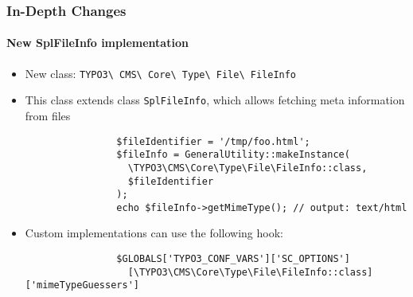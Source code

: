 \begin{frame}[fragile]
	\frametitle{In-Depth Changes}
	\framesubtitle{New SplFileInfo implementation}

	\lstset{basicstyle=\smaller\ttfamily}

	\begin{itemize}

		\item New class:
			\texttt{TYPO3\textbackslash
				CMS\textbackslash
				Core\textbackslash
				Type\textbackslash
				File\textbackslash
				FileInfo}

		\item This class extends class \texttt{SplFileInfo}, which allows fetching meta information from files

			\begin{lstlisting}
				$fileIdentifier = '/tmp/foo.html';
				$fileInfo = GeneralUtility::makeInstance(
				  \TYPO3\CMS\Core\Type\File\FileInfo::class,
				  $fileIdentifier
				);
				echo $fileInfo->getMimeType(); // output: text/html
			\end{lstlisting}

		\item Custom implementations can use the following hook:

			\begin{lstlisting}
				$GLOBALS['TYPO3_CONF_VARS']['SC_OPTIONS']
				  [\TYPO3\CMS\Core\Type\File\FileInfo::class]['mimeTypeGuessers']
			\end{lstlisting}

	\end{itemize}

\end{frame}


